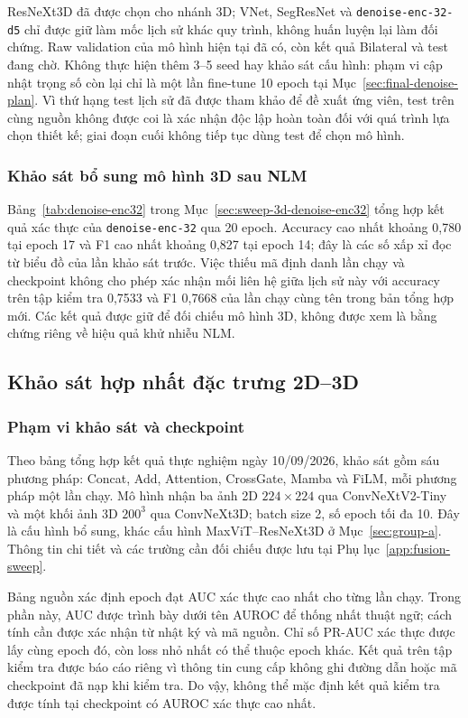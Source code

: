 \documentclass[14pt,a4paper,oneside]{extreport}
\begin{document}
ResNeXt3D đã được chọn cho nhánh 3D; VNet, SegResNet và
\texttt{denoise-enc-32-d5} chỉ được giữ làm mốc lịch sử khác quy trình,
không huấn luyện lại làm đối chứng. Raw validation của mô hình hiện tại
đã có, còn kết quả Bilateral và test đang chờ. Không thực hiện thêm
3--5 seed hay khảo sát cấu hình: phạm vi cập nhật trọng số còn lại chỉ
là một lần fine-tune 10 epoch tại Mục~\ref{sec:final-denoise-plan}.
Vì thứ hạng test lịch sử đã được tham khảo để đề xuất ứng viên, test
trên cùng nguồn không được coi là xác nhận độc lập hoàn toàn đối với
quá trình lựa chọn thiết kế; giai đoạn cuối không tiếp tục dùng test để chọn mô hình.
\FloatBarrier

\subsubsection{Khảo sát bổ sung mô hình 3D sau NLM}
Bảng~\ref{tab:denoise-enc32} trong
Mục~\ref{sec:sweep-3d-denoise-enc32} tổng hợp kết quả xác thực của
\texttt{denoise-enc-32} qua 20 epoch. Accuracy cao nhất khoảng
0,780 tại epoch 17 và F1 cao nhất khoảng 0,827 tại epoch 14;
đây là các số xấp xỉ đọc từ biểu đồ của lần khảo sát trước. Việc thiếu
mã định danh lần chạy và checkpoint không cho phép xác nhận mối liên hệ giữa lịch sử này với accuracy
trên tập kiểm tra 0,7533 và F1 0,7668 của lần chạy cùng tên trong bản tổng hợp mới.
Các kết quả được giữ để đối chiếu mô hình 3D, không được xem là
bằng chứng riêng về hiệu quả khử nhiễu NLM.

\subsection{Khảo sát hợp nhất đặc trưng 2D--3D}
\label{sec:group-a-results}
\label{sec:fusion-sweep-results}
\subsubsection{Phạm vi khảo sát và checkpoint}
Theo bảng tổng hợp kết quả thực nghiệm ngày 10/09/2026, khảo sát gồm
sáu phương pháp: Concat, Add, Attention, CrossGate, Mamba và FiLM,
mỗi phương pháp một lần chạy. Mô hình nhận ba ảnh 2D $224\times224$
qua ConvNeXtV2-Tiny và một khối ảnh 3D $200^3$ qua ConvNeXt3D;
batch size 2, số epoch tối đa 10. Đây là cấu hình bổ sung, khác
cấu hình MaxViT--ResNeXt3D ở Mục~\ref{sec:group-a}.
Thông tin chi tiết và các trường cần đối chiếu được lưu tại
Phụ lục~\ref{app:fusion-sweep}.

Bảng nguồn xác định epoch đạt AUC xác thực cao nhất cho từng lần chạy.
Trong phần này, AUC được trình bày dưới tên AUROC để thống nhất thuật
ngữ; cách tính cần được xác nhận từ nhật ký và mã nguồn. Chỉ số PR-AUC
xác thực được lấy cùng epoch đó, còn loss nhỏ nhất có thể thuộc epoch
khác. Kết quả trên tập kiểm tra được báo cáo riêng vì thông tin cung cấp không ghi
đường dẫn hoặc mã checkpoint đã nạp khi kiểm tra. Do vậy, không thể mặc
định kết quả kiểm tra được tính tại checkpoint có AUROC xác thực cao nhất.
\end{document}
